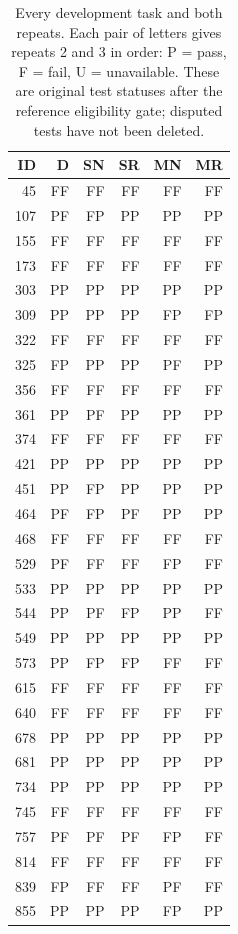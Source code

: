 \begin{table}[!htbp]\centering\footnotesize
\caption{Every development task and both repeats. Each pair of letters gives repeats 2 and 3 in order: P = pass, F = fail, U = unavailable. These are original test statuses after the reference eligibility gate; disputed tests have not been deleted.}\label{tab:dev40-all}
\begin{tabular*}{\textwidth}{@{\extracolsep{\fill}}rrrrrr}\toprule
ID & D & SN & SR & MN & MR\\\midrule
45 & FF & FF & FF & FF & FF\\
107 & PF & FP & PP & PP & PP\\
155 & FF & FF & FF & FF & FF\\
173 & FF & FF & FF & FF & FF\\
303 & PP & PP & PP & PP & PP\\
309 & PP & PP & PP & FP & FP\\
322 & FF & FF & FF & FF & FF\\
325 & FP & PP & PP & PF & PP\\
356 & FF & FF & FF & FF & FF\\
361 & PP & PF & PP & PP & PP\\
374 & FF & FF & FF & FF & FF\\
421 & PP & PP & PP & PP & PP\\
451 & PP & FP & PP & PP & PP\\
464 & PF & FP & PF & PP & PP\\
468 & FF & FF & FF & FF & FF\\
529 & PF & FF & FF & FP & FF\\
533 & PP & PP & PP & PP & PP\\
544 & PP & PF & FP & PP & FF\\
549 & PP & PP & PP & PP & PP\\
573 & PP & FP & FP & FF & FF\\
615 & FF & FF & FF & FF & FF\\
640 & FF & FF & FF & FF & FF\\
678 & PP & PP & PP & PP & PP\\
681 & PP & PP & PP & PP & PP\\
734 & PP & PP & PP & PP & PP\\
745 & FF & FF & FF & FF & FF\\
757 & PF & PF & PF & FP & FF\\
814 & FF & FF & FF & FF & FF\\
839 & FP & FF & FF & PF & FF\\
855 & PP & PP & PP & FP & PP\\

\end{tabular*}
\end{table}
